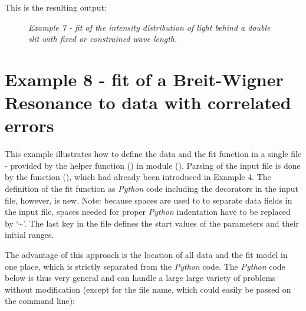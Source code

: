\documentclass[a4paper,10pt,english]{sphinxmanual}
\begin{document}
This is the resulting output:
\begin{figure}[htbp]
\centering
\capstart

\caption{\emph{Example 7 - fit of the intensity distribution of light behind a double slit with fixed or constrained wave length.}}\end{figure}


\section{Example 8 - fit of a Breit-Wigner Resonance to data with correlated errors}
\label{index:example-8-fit-of-a-breit-wigner-resonance-to-data-with-correlated-errors}
This example illustrates how to define the data and the fit function
in a single file - provided by the helper function {\hyperref[index:kafe.file_tools.buildFit_fromFile]{\emph{}}} ()
in module {\hyperref[index:module-file_tools]{\emph{}}} (). Parsing of the input file is done by the
function {\hyperref[index:kafe.file_tools.parse_general_inputfile]{\emph{}}} (), which had already been introduced
in Example 4. The definition of the fit function as \emph{Python} code
including the  decorators in the input file, however, is new.
Note: because spaces are used to to separate data  fields in the
input file, spaces needed for proper \emph{Python} indentation have to be
replaced by `\textasciitilde{}'. The last key in the file defines the start values
of the parameters and their initial ranges.

The advantage of this approach is the location of all data
and the fit model in one place, which is strictly separated
from the \emph{Python} code. The \emph{Python} code below is thus very general
and can handle a large large variety of problems without
modification (except for the file name, which could easily be
passed on the command line):
\end{document}
